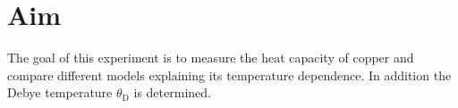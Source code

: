 \section{Aim}
\label{sec:versuchsziel}
The goal of this experiment is to measure the heat capacity of copper 
and compare different models explaining its temperature dependence. 
In addition the Debye temperature $\theta_\text{D}$ is determined.
